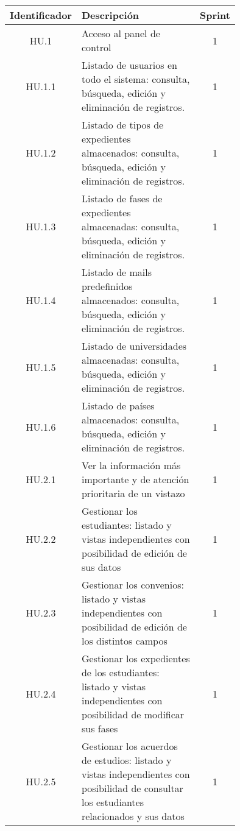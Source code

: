 \begin{table}[h]
	\begin{center}
		\begin{adjustbox}{width=1\textwidth}
			\begin{tabular}{ | c | >{\centering\arraybackslash}p{0.75\linewidth} | c | } 
				\hline
				\textbf{Identificador} & \textbf{Descripción} & \textbf{Sprint} \\
				\hline
				HU.1 \label{HU1} &  Acceso al panel de control & 1 \\
				\hline
				HU.1.1 \label{HU1.1} & Listado de usuarios en todo el sistema: consulta, búsqueda, edición y eliminación de registros. & 1 \\
				\hline
				HU.1.2 \label{HU1.2} & Listado de tipos de expedientes almacenados: consulta, búsqueda, edición y eliminación de registros. & 1 \\
				\hline
				HU.1.3 \label{HU1.3} & Listado de fases de expedientes almacenadas: consulta, búsqueda, edición y eliminación de registros. & 1 \\
				\hline
				HU.1.4 \label{HU1.4} & Listado de mails predefinidos almacenados: consulta, búsqueda, edición y eliminación de registros. & 1 \\
				\hline
				HU.1.5 \label{HU1.5} & Listado de universidades almacenadas: consulta, búsqueda, edición y eliminación de registros. & 1 \\
				\hline
				HU.1.6 \label{HU1.6} & Listado de países almacenados: consulta, búsqueda, edición y eliminación de registros. & 1 \\
				\hline
				HU.2.1 \label{HU2.1} & Ver la información más importante y de atención prioritaria de un vistazo & 1 \\
				\hline
				HU.2.2 \label{HU2.2} & Gestionar los estudiantes: listado y vistas independientes con posibilidad de edición de sus datos & 1 \\
				\hline
				HU.2.3 \label{HU2.3} & Gestionar los convenios: listado y vistas independientes con posibilidad de edición de los distintos campos & 1 \\
				\hline
				HU.2.4 \label{HU2.4} & Gestionar los expedientes de los estudiantes: listado y vistas independientes con posibilidad de modificar sus fases & 1 \\
				\hline
				HU.2.5 \label{HU2.5} & Gestionar los acuerdos de estudios: listado y vistas independientes con posibilidad de consultar los estudiantes relacionados y sus datos & 1 \\
				\hline

\end{tabular}
\end{adjustbox}
\end{center}
\end{table}
